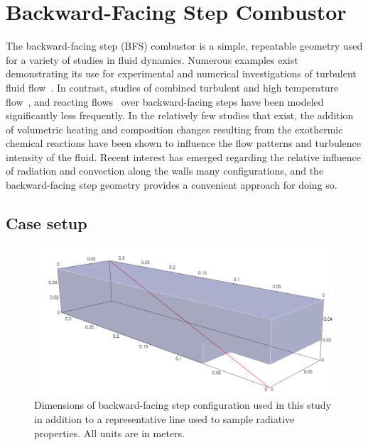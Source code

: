 





\section{Backward-Facing Step Combustor}
The backward-facing step (BFS) combustor is a simple, repeatable geometry used for a variety of studies in fluid dynamics.
Numerous examples exist demonstrating its use for experimental and numerical investigations of turbulent fluid flow~\cite{Armaly1983ExperimentalFlow,Neto1993AStep,Jovic1994Backward-facing5000,Le1997DirectStep}. In contrast, studies of combined turbulent and high temperature flow~\cite{Niemann2016Buoyancy-affectedNumber,Xie2017GeometrySteps}, and reacting flows~\cite{Pouech2021PremixedStep} over backward-facing steps have been modeled significantly less frequently.
In the relatively few studies that exist, the addition of volumetric heating and composition changes resulting from the exothermic chemical reactions have been shown to influence the flow patterns and turbulence intensity of the fluid. 
Recent interest has emerged regarding the relative influence of radiation and convection along the walls many configurations, and the backward-facing step geometry provides a convenient approach for doing so.

\subsection{Case setup}
\begin{figure}
\includegraphics[width=\linewidth]{figures/ch4/BFS_visual.png}
\caption{Dimensions of backward-facing step configuration used in this study in addition to a representative line used to sample radiative properties. All units are in meters. }
\label{fig:BFS_geometry}
\end{figure}

